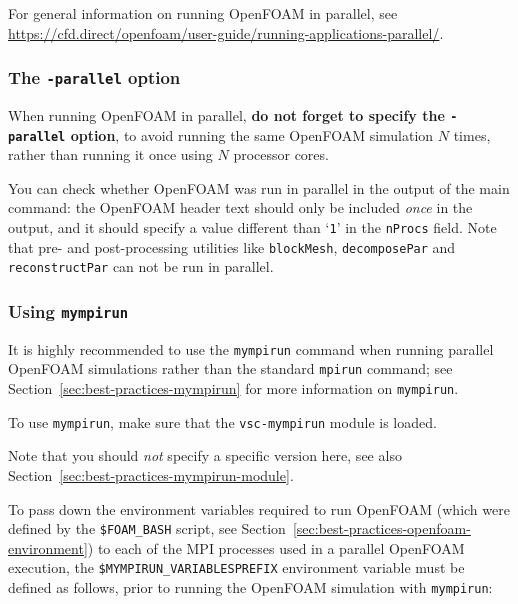 For general information on running OpenFOAM in parallel,
see {\small\url{https://cfd.direct/openfoam/user-guide/running-applications-parallel/}}.

\subsubsection{The {\small\texttt{-parallel}} option}

When running OpenFOAM in parallel, \textbf{do not forget to specify the \texttt{\small{-parallel}} option},
to avoid running the same OpenFOAM simulation $N$ times, rather than running it once using $N$ processor cores.

You can check whether OpenFOAM was run in parallel in the output of the main command:
the OpenFOAM header text should only be included \textit{once} in the output, and it should specify a value different
than `\texttt{\small{1}}' in the \texttt{\small{nProcs}} field. Note that pre- and post-processing utilities like
\texttt{\small{blockMesh}}, \texttt{\small{decomposePar}} and \texttt{\small{reconstructPar}} can not be run in parallel.

\subsubsection{Using \texttt{mympirun}}

It is highly recommended to use the {\small\texttt{mympirun}} command when running parallel OpenFOAM simulations
rather than the standard {\small\texttt{mpirun}} command;
see Section~\ref{sec:best-practices-mympirun} for more information on {\small\texttt{mympirun}}.

To use {\small\texttt{mympirun}}, make sure that the \texttt{\small{vsc-mympirun}} module is loaded.

\begin{prompt}
\end{prompt}

Note that you should \textit{not} specify a specific version here,
see also Section~\ref{sec:best-practices-mympirun-module}.

To pass down the environment variables required to run OpenFOAM (which were defined by the
\texttt{\small{\$FOAM\_BASH}} script, see Section~\ref{sec:best-practices-openfoam-environment})
to each of the MPI processes used in a parallel OpenFOAM execution,
the \texttt{\small{\$MYMPIRUN\_VARIABLESPREFIX}} environment variable must be defined as follows,
prior to running the OpenFOAM simulation with \texttt{\small{mympirun}}:


